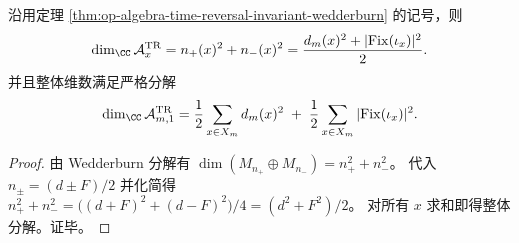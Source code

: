 \begin{corollary}\label{cor:op-algebra-time-reversal-invariant-dimension}
沿用定理 \ref{thm:op-algebra-time-reversal-invariant-wedderburn} 的记号，则
\[
\dim_\CC \mathcal A_x^{\mathrm{TR}}
=n_+(x)^2+n_-(x)^2
=\frac{d_m(x)^2+|\mathrm{Fix}(\iota_x)|^2}{2}.
\]
并且整体维数满足严格分解
\[
\dim_\CC \mathcal A_{m,1}^{\mathrm{TR}}
=\frac{1}{2}\sum_{x\in X_m} d_m(x)^2\;+\;\frac{1}{2}\sum_{x\in X_m}|\mathrm{Fix}(\iota_x)|^2.
\]
\end{corollary}

\begin{proof}
由 Wedderburn 分解有
\(
\dim(M_{n_+}\oplus M_{n_-})=n_+^2+n_-^2
\)。
代入 \(n_\pm=(d\pm F)/2\) 并化简得
\(
n_+^2+n_-^2=\bigl((d+F)^2+(d-F)^2\bigr)/4=(d^2+F^2)/2
\)。
对所有 \(x\) 求和即得整体分解。证毕。
\end{proof}

\endinput
